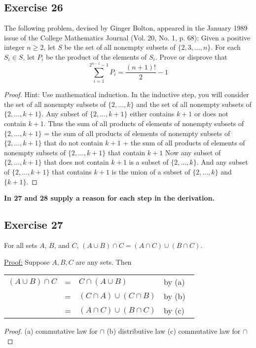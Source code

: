 \documentclass[14pt]{extarticle}
\newcommand{\fbl}{\underline{\hspace{1cm}}\,\,}
\newcommand{\cy}{\color{cyan}}
\begin{document}
\subsection{Exercise 26}
The following problem, devised by Ginger Bolton, appeared in the January 1989 issue of the College Mathematics Journal (Vol. 20, No. 1, p. 68): Given a positive integer $n \geq 2$, let $S$ be the set of all nonempty subsets of \(\{2, 3, \ldots, n\}\). For each \(S_i \in S\), let $P_i$ be the product of the elements of $S_i$. Prove or disprove that
\[
  \sum_{i=1}^{2^{n-1}-1} P_i = \frac{(n+1)!}{2} - 1
\]
\begin{proof}
  Hint: Use mathematical induction. In the inductive step, you will consider the set of all nonempty subsets of
  \(\{2, \ldots, k\}\) and the set of all nonempty subsets of \(\{2, \ldots, k + 1\}\). Any subset of
  \(\{2, \ldots, k + 1\}\) either contains \(k + 1\) or does not contain \(k + 1\). Thus the sum of all products of
  elements of nonempty subsets of \(\{2, \ldots , k + 1\}\) = the sum of all products of elements of nonempty subsets of
  \(\{2, \ldots, k + 1\}\) that do not contain \(k + 1\) + the sum of all products of elements of nonempty subsets of
  \(\{2, \ldots, k + 1\}\) that contain \(k + 1\) Now any subset of \(\{2, \ldots, k + 1\}\) that does not contain
  \(k + 1\) is a subset of \(\{2, \ldots, k\}\). And any subset of \(\{2, \ldots, k + 1\}\) that contains \(k + 1\)
  is the union of a subset of \(\{2, \ldots, k\}\) and \(\{k + 1\}\).
\end{proof}

{\bf \cy In 27 and 28 supply a reason for each step in the derivation.}

\subsection{Exercise 27}
For all sets $A$, $B$, and $C$, \((A \cup B) \cap C = (A \cap C) \cup (B \cap C)\).

\underline{Proof:} Suppose $A,B,C$ are any sets. Then

\begin{tabular}{rcll}
  \((A \cup B) \cap C\) & = & \(C \cap (A \cup B)\)          & by (a) \fbl \\
                        & = & \((C \cap A) \cup (C \cap B)\) & by (b) \fbl \\
                        & = & \((A \cap C) \cup (B \cap C)\) & by (c) \fbl
\end{tabular}

\begin{proof}
  (a) commutative law for $\cap$ (b) distributive law (c) commutative law for $\cap$
\end{proof}
\end{document}
